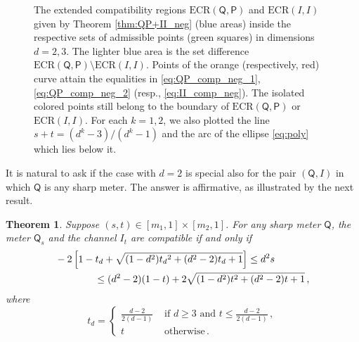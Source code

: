 \documentclass[12pt,reqno]{amsart}
\newtheorem{theorem}{Theorem}
\theoremstyle{definition}
\newcommand{\Qo}{\mathsf{Q}}%
\newcommand{\Po}{\mathsf{P}}%
\newcommand{\ECR}[1]{\textrm{ECR} #1} %
\begin{document}
\begin{figure}[h!]
\centering
{}
\caption{The extended compatibility regions $\ECR{(\Qo,\Po)}$ and $\ECR{(I,I)}$ given by Theorem \ref{thm:QP+II_neg} (blue areas) inside the respective sets of admissible points (green squares) in dimensions $d=2,3$.
The lighter blue area is the set difference $\ECR{(\Qo,\Po)}\setminus\ECR{(I,I)}$. Points of the orange (respectively, red) curve attain the equalities in \eqref{eq:QP_comp_neg_1}, \eqref{eq:QP_comp_neg_2} (resp., \eqref{eq:II_comp_neg}). The isolated colored points still belong to the boundary of $\ECR{(\Qo,\Po)}$ or $\ECR{(I,I)}$. For each $k=1,2$, we also plotted the line $s+t=(d^k-3)/(d^k-1)$ and the arc of the ellipse \eqref{eq:poly} which lies below it.\label{fig:comp_neg_QP+II}}
\end{figure}

It is natural to ask if the case with $d=2$ is special also for the pair $(\Qo,I)$ in which $\Qo$ is any sharp meter. The answer is affirmative, as illustrated by the next result.
\begin{theorem}\label{thm:main_neg}
Suppose $(s,t)\in [m_1,1]\times [m_2,1]$. For any sharp meter $\Qo$, the meter $\Qo_s$ and the channel $I_t$ are compatible if and only if
\begin{equation}\label{eq:QI_comp_neg}
\begin{aligned}
& - 2\left[1 - t_d + \sqrt{(1 - d^2) \smash[b]{t_d}^2 + (d^2 - 2) \smash[b]{t_d} + 1}\right] \leq d^2 s \\
& \qquad\qquad \leq (d^2 - 2) (1 - t) + 2\sqrt{(1 - d^2) t^2 + (d^2 - 2) t + 1} \,,
\end{aligned}
\end{equation}
where
\begin{equation} %
t_d = \begin{cases}
\displaystyle \frac{d - 2}{2(d - 1)} & \displaystyle \text{ if } d \geq 3 \text{ and } t\leq\frac{d - 2}{2(d - 1)}\,, \\[0.3cm]
t & \text{ otherwise}\,.
\end{cases}
\end{equation}
\end{theorem}
\end{document}
